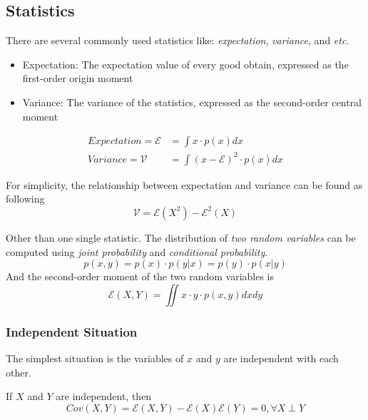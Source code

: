 \documentclass[../main.tex]{subfiles}
\begin{document}
\subsection{Statistics}
There are several commonly used statistics like: \emph{expectation}, \emph{variance}, and \textit{etc}.
\begin{itemize}
    \item Expectation: The expectation value of every good obtain, expressed as the first-order origin moment
    \item Variance: The variance of the statistics, expressed as the second-order central moment
\end{itemize}
\begin{equation}
    \label{Definition: Expectation and variance definition}
    \begin{split}
        Expectation = \mathcal{E} & = \int x \cdot p(x) dx                 \\
        Variance = \mathcal{V}    & = \int (x-\mathcal{E})^2 \cdot p(x) dx
    \end{split}
\end{equation}
\begin{lemma}
    \label{Lemma: Relationship between expectation and variance}
    For simplicity, the relationship between expectation and variance can be found as following
    \begin{equation*}
        \mathcal{V} = \mathcal{E}(X^2) - \mathcal{E}^2(X)
    \end{equation*}
\end{lemma}

Other than one single statistic.
The distribution of \emph{two random variables} can be computed using \emph{joint probability} and \emph{conditional probability}.
\begin{equation*}
    p(x, y) = p(x) \cdot p(y|x) = p(y) \cdot p(x|y)
\end{equation*}
And the second-order moment of the two random variables is
\begin{equation*}
    \mathcal{E}(X, Y) = \iint x \cdot y \cdot p(x, y) dx dy
\end{equation*}

\subsubsection{Independent Situation}

The simplest situation is the variables of $x$ and $y$ are independent with each other.
\begin{lemma}
    \label{Lemma: Second-order mixing moment of independent variables}
    If $X$ and $Y$ are independent, then
    \begin{equation*}
        Cov(X, Y) =
        \mathcal{E}(X, Y) - \mathcal{E}(X) \mathcal{E}(Y) = 0,
        \forall X \perp Y
    \end{equation*}
\end{lemma}
\end{document}
